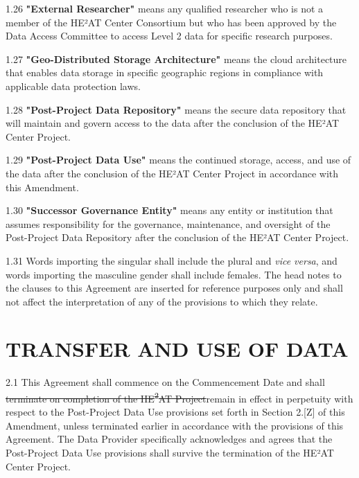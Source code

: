 \documentclass[12pt,letterpaper]{article}
\newcommand{\deleted}[1]{\textcolor{deletecolor}{\sout{#1}}}
\newcommand{\added}[1]{\textcolor{addcolor}{#1}}
\begin{document}
\added{1.26 \textbf{"External Researcher"} means any qualified researcher who is not a member of the HE²AT Center Consortium but who has been approved by the Data Access Committee to access Level 2 data for specific research purposes.}

\added{1.27 \textbf{"Geo-Distributed Storage Architecture"} means the cloud architecture that enables data storage in specific geographic regions in compliance with applicable data protection laws.}

\added{1.28 \textbf{"Post-Project Data Repository"} means the secure data repository that will maintain and govern access to the data after the conclusion of the HE²AT Center Project.}

\added{1.29 \textbf{"Post-Project Data Use"} means the continued storage, access, and use of the data after the conclusion of the HE²AT Center Project in accordance with this Amendment.}

\added{1.30 \textbf{"Successor Governance Entity"} means any entity or institution that assumes responsibility for the governance, maintenance, and oversight of the Post-Project Data Repository after the conclusion of the HE²AT Center Project.}

1.31 Words importing the singular shall include the plural and \textit{vice versa}, and words importing the masculine gender shall include females. The head notes to the clauses to this Agreement are inserted for reference purposes only and shall not affect the interpretation of any of the provisions to which they relate.

\section{TRANSFER AND USE OF DATA}

2.1 This Agreement shall commence on the Commencement Date and shall \deleted{terminate on completion of the HE\textsuperscript{2}AT Project}\added{remain in effect in perpetuity with respect to the Post-Project Data Use provisions set forth in Section 2.[Z] of this Amendment, unless terminated earlier in accordance with the provisions of this Agreement. The Data Provider specifically acknowledges and agrees that the Post-Project Data Use provisions shall survive the termination of the HE²AT Center Project}.
\end{document}
